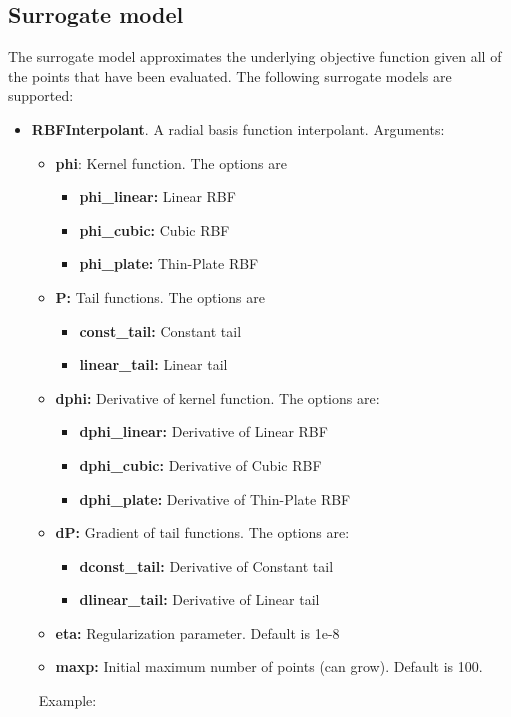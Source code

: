 \documentclass[]{article}
\begin{document}
\subsection{Surrogate model} 
\label{surrogate}
The surrogate model approximates the underlying objective function given all of the points that have been evaluated. The following surrogate models are supported:
\begin{itemize}
\item \textbf{RBFInterpolant}. A radial basis function interpolant. Arguments:
\begin{itemize}
\item \textbf{phi}: Kernel function. The options are 
\begin{itemize}
\item \textbf{phi\_linear:} Linear RBF
\item \textbf{phi\_cubic:} Cubic RBF
\item \textbf{phi\_plate:} Thin-Plate RBF
\end{itemize}
\item \textbf{P:} Tail functions. The options are
\begin{itemize}
\item \textbf{const\_tail:} Constant tail
\item \textbf{linear\_tail:} Linear tail
\end{itemize}
\item \textbf{dphi:} Derivative of kernel function. The options are:
\begin{itemize}
\item \textbf{dphi\_linear:} Derivative of Linear RBF
\item \textbf{dphi\_cubic:} Derivative of Cubic RBF
\item \textbf{dphi\_plate:} Derivative of Thin-Plate RBF
\end{itemize}
\item \textbf{dP:} Gradient of tail functions. The options are:
\begin{itemize}
\item \textbf{dconst\_tail:} Derivative of Constant tail
\item \textbf{dlinear\_tail:} Derivative of Linear tail
\end{itemize}
\item \textbf{eta:} Regularization parameter. Default is 1e-8
\item \textbf{maxp:} Initial maximum number of points (can grow). Default is 100.
\end{itemize}
\ \newline Example:

\end{itemize}
\end{document}
